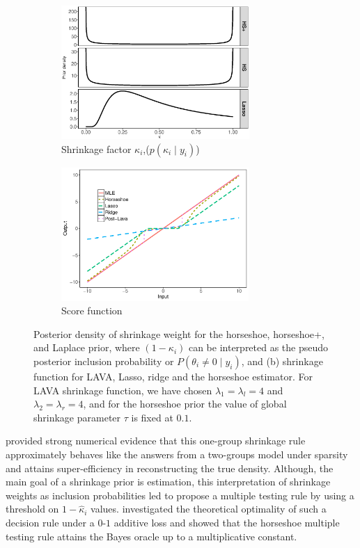 \documentclass[sts,preprint]{imsart}
\begin{document}
\begin{figure}[!ht]
\begin{subfigure}{0.48\linewidth}
\centering
\includegraphics[height = 2in, width=\textwidth]{prior_diff_kappa}
\caption{\footnotesize{Shrinkage factor $\kappa_i$,($p(\kappa_i \mid y_i)$)}}
\label{fig:priorkappa}
\end{subfigure}
\begin{subfigure}{0.48\linewidth}%
\centering
\includegraphics[height = 2in, width=\columnwidth]{shrinakge_hs_lasso_lava}%
\caption{Score function}%
\label{fig:score}%
\end{subfigure}
\label{fig:score-kappa}
\caption{\footnotesize{Posterior density of shrinkage weight for the horseshoe, horseshoe+, and Laplace
prior, where $(1- \kappa_i)$ can be interpreted as the pseudo posterior inclusion probability or $P(\theta_i \ne 0 \mid y_i)$, and (b) shrinkage function for LAVA, Lasso, ridge and the horseshoe estimator. For
LAVA shrinkage function, we have chosen $\lambda_1 = \lambda_l = 4$ and $\lambda_2 = \lambda_r = 4$, and for the horseshoe prior the value of global shrinkage parameter $\tau$ is fixed at $0.1$.}}
\end{figure}


\citet{carvalho2010horseshoe} provided strong numerical evidence that this one-group shrinkage rule approximately behaves like the answers from a two-groups model under sparsity and attains super-efficiency in reconstructing the true density. Although, the main goal of a shrinkage prior is estimation, this interpretation of shrinkage weights as inclusion probabilities led \citet{carvalho2010horseshoe} to propose a multiple testing rule by using a threshold on $1-\hat{\kappa}_i$ values. \citet{datta2013asymptotic}
investigated the theoretical optimality of such a decision rule under a $0$-$1$ additive loss and showed that the horseshoe multiple testing rule attains the Bayes oracle up to a multiplicative constant. 
\end{document}
